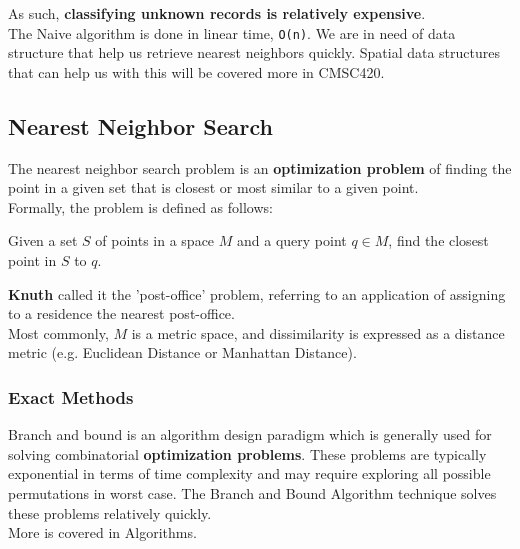 \documentclass[english, 10pt]{article}
\begin{document}
As such, \textbf{classifying unknown records is relatively expensive}.\\

The Naive algorithm is done in linear time, \texttt{O(n)}. We are in need of data structure that help us retrieve nearest neighbors quickly. Spatial data structures that can help us with this will be covered more in CMSC420.

\subsection{Nearest Neighbor Search}

The nearest neighbor search problem is an \textbf{optimization problem} of finding the point in a given set that is closest or most similar to a given point.\\

Formally, the problem is defined as follows:\\

\begin{myproof}
Given a set $S$ of points in a space $M$ and a query point $q \in M$, find the closest point in $S$ to $q$.
\end{myproof}

\textbf{Knuth} called it the 'post-office' problem, referring to an application of assigning to a residence the nearest post-office.\\

Most commonly, $M$ is a metric space, and dissimilarity is expressed as a distance metric (e.g. Euclidean Distance or Manhattan Distance).

\subsubsection{Exact Methods}

\hfill

\begin{tcolorbox}[title=Aside: Branch and Bound Paradigm,colframe=black,colback=white,arc=0pt,fonttitle=\bfseries]

Branch and bound is an algorithm design paradigm which is generally used for solving combinatorial \textbf{optimization problems}. These problems are typically exponential in terms of time complexity and may require exploring all possible permutations in worst case. The Branch and Bound Algorithm technique solves these problems relatively quickly.\\

More is covered in Algorithms.

\end{tcolorbox}
\end{document}

